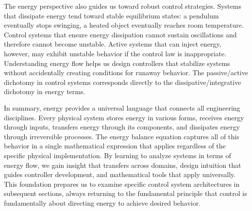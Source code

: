 The energy perspective also guides us toward robust control strategies. Systems that dissipate energy tend toward stable equilibrium states: a pendulum eventually stops swinging, a heated object eventually reaches room temperature. Control systems that ensure energy dissipation cannot sustain oscillations and therefore cannot become unstable. Active systems that can inject energy, however, may exhibit unstable behavior if the control law is inappropriate. Understanding energy flow helps us design controllers that stabilize systems without accidentally creating conditions for runaway behavior. The passive/active dichotomy in control systems corresponds directly to the dissipative/integrative dichotomy in energy terms.

In summary, energy provides a universal language that connects all engineering disciplines. Every physical system stores energy in various forms, receives energy through inputs, transfers energy through its components, and dissipates energy through irreversible processes. The energy balance equation captures all of this behavior in a single mathematical expression that applies regardless of the specific physical implementation. By learning to analyze systems in terms of energy flow, we gain insight that transfers across domains, design intuition that guides controller development, and mathematical tools that apply universally. This foundation prepares us to examine specific control system architectures in subsequent sections, always returning to the fundamental principle that control is fundamentally about directing energy to achieve desired behavior.